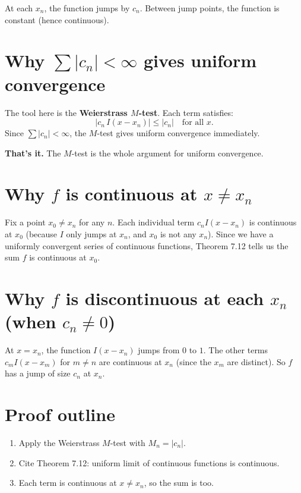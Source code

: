 \documentclass[12pt]{article}
\begin{document}
At each $x_n$, the function jumps by $c_n$. Between jump points, the function is constant (hence continuous).

\section*{Why $\sum |c_n| < \infty$ gives uniform convergence}

The tool here is the \textbf{Weierstrass $M$-test}. Each term satisfies:
$$
|c_n\, I(x - x_n)| \leq |c_n| \quad \text{for all } x.
$$
Since $\sum |c_n| < \infty$, the $M$-test gives uniform convergence immediately.

\textbf{That's it.} The $M$-test is the whole argument for uniform convergence.

\section*{Why $f$ is continuous at $x \neq x_n$}

Fix a point $x_0 \neq x_n$ for any $n$. Each individual term $c_n I(x - x_n)$ is continuous at $x_0$ (because $I$ only jumps at $x_n$, and $x_0$ is not any $x_n$). Since we have a uniformly convergent series of continuous functions, Theorem 7.12 tells us the sum $f$ is continuous at $x_0$.

\section*{Why $f$ is discontinuous at each $x_n$ (when $c_n \neq 0$)}

At $x = x_n$, the function $I(x - x_n)$ jumps from $0$ to $1$. The other terms $c_m I(x - x_m)$ for $m \neq n$ are continuous at $x_n$ (since the $x_m$ are distinct). So $f$ has a jump of size $c_n$ at $x_n$.

\section*{Proof outline}
\begin{enumerate}
    \item Apply the Weierstrass $M$-test with $M_n = |c_n|$.
    \item Cite Theorem 7.12: uniform limit of continuous functions is continuous.
    \item Each term is continuous at $x \neq x_n$, so the sum is too.
\end{enumerate}
\end{document}

